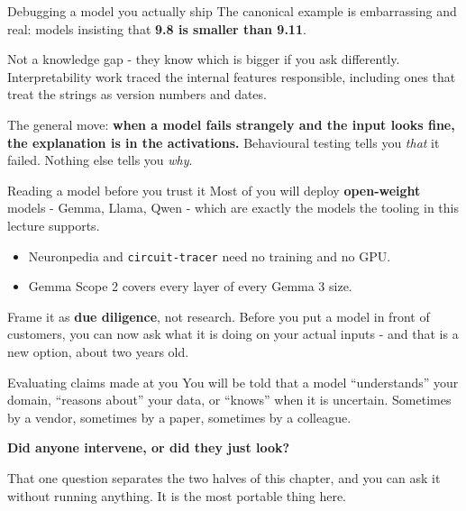 \documentclass[aspectratio=169]{beamer}
\newcommand{\keybox}[1]{%
  \begin{tcolorbox}[colback=armblue!8, colframe=armblue, boxrule=0.6pt, arc=2pt]
  #1
  \end{tcolorbox}}
\newcommand{\takebox}[1]{%
  \begin{tcolorbox}[colback=paramgreen!8, colframe=paramgreen, boxrule=0.6pt, arc=2pt]
  #1
  \end{tcolorbox}}
\begin{document}
\begin{frame}{Debugging a model you actually ship}
  \vspace{0.8em}
  The canonical example is embarrassing and real: models insisting that \textbf{9.8 is smaller
  than 9.11}.

  \vspace{0.7em}
  Not a knowledge gap - they know which is bigger if you ask differently. Interpretability work
  traced the internal features responsible, including ones that treat the strings as version
  numbers and dates.

  \vspace{0.9em}
  \takebox{The general move: \textbf{when a model fails strangely and the input looks fine, the
  explanation is in the activations.} Behavioural testing tells you \emph{that} it failed.
  Nothing else tells you \emph{why}.}
\end{frame}

\begin{frame}{Reading a model before you trust it}
  \vspace{0.8em}
  Most of you will deploy \textbf{open-weight} models - Gemma, Llama, Qwen - which are exactly
  the models the tooling in this lecture supports.

  \vspace{0.7em}
  \begin{itemize}
    \item Neuronpedia and \texttt{circuit-tracer} need no training and no GPU.
    \item Gemma Scope 2 covers every layer of every Gemma 3 size.
  \end{itemize}

  \vspace{0.9em}
  \keybox{Frame it as \textbf{due diligence}, not research. Before you put a model in front of
  customers, you can now ask what it is doing on your actual inputs - and that is a new option,
  about two years old.}
\end{frame}

\begin{frame}{Evaluating claims made at you}
  \vspace{0.9em}
  You will be told that a model ``understands'' your domain, ``reasons about'' your data, or
  ``knows'' when it is uncertain. Sometimes by a vendor, sometimes by a paper, sometimes by a
  colleague.

  \vspace{1.1em}
  \begin{center}
  \begin{tcolorbox}[colback=paramgreen!8, colframe=paramgreen, boxrule=0.8pt, arc=3pt,
                    width=0.86\textwidth]
    \centering\large
    \textbf{Did anyone intervene, or did they just look?}
  \end{tcolorbox}
  \end{center}

  \vspace{1.1em}
  \takebox{That one question separates the two halves of this chapter, and you can ask it without
  running anything. It is the most portable thing here.}
\end{frame}
\end{document}
